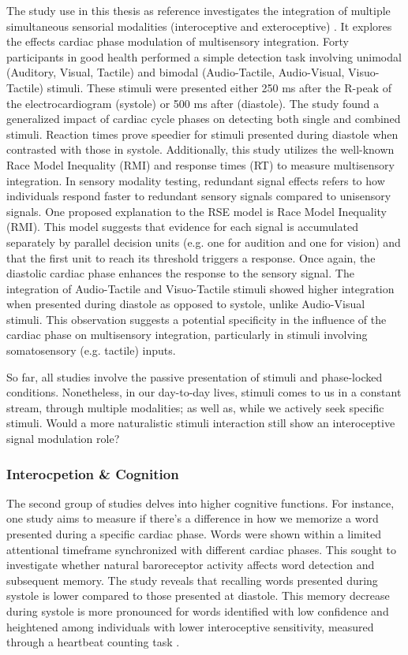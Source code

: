 \documentclass[12pt,oneside,openright]{report}
\begin{document}
The study use in this thesis as reference investigates the integration of multiple simultaneous sensorial modalities (interoceptive and exteroceptive) \parencite{SALTAFOSSI2023108642}. It explores the effects cardiac phase modulation of multisensory integration. Forty participants in good health performed a simple detection task involving unimodal (Auditory, Visual, Tactile) and bimodal (Audio-Tactile, Audio-Visual, Visuo-Tactile) stimuli. These stimuli were presented either 250 ms after the R-peak of the electrocardiogram (systole) or 500 ms after (diastole). The study found a generalized impact of cardiac cycle phases on detecting both single and combined stimuli. Reaction times prove speedier for stimuli presented during diastole when contrasted with those in systole. Additionally, this study utilizes the well-known Race Model Inequality (RMI) and response times (RT) to measure multisensory integration. In sensory modality testing, redundant signal effects refers to how individuals respond faster to redundant sensory signals compared to unisensory signals. One proposed explanation to the RSE model is Race Model Inequality (RMI). This model suggests that evidence for each signal is accumulated separately by parallel decision units (e.g. one for audition and one for vision) and that the first unit to reach its threshold triggers a response\parencite{Innes2019ACA,MILLER1982247}. Once again, the diastolic cardiac phase enhances the response to the sensory signal. The integration of Audio-Tactile and Visuo-Tactile stimuli showed higher integration when presented during diastole as opposed to systole, unlike Audio-Visual stimuli. This observation suggests a potential specificity in the influence of the cardiac phase on multisensory integration, particularly in stimuli involving somatosensory (e.g. tactile) inputs.

So far, all studies involve the passive presentation of stimuli and phase-locked conditions. Nonetheless, in our day-to-day lives, stimuli comes to us in a constant stream, through multiple modalities; as well as, while we actively seek specific stimuli. Would a more naturalistic stimuli interaction still show an interoceptive signal modulation role?

\subsubsection*{Interocpetion \& Cognition}

The second group of studies delves into higher cognitive functions. For instance, one study aims to measure if there's a difference in how we memorize a word presented during a specific cardiac phase. Words were shown within a limited attentional timeframe synchronized with different cardiac phases. This sought to investigate whether natural baroreceptor activity affects word detection and subsequent memory. The study reveals that recalling words presented during systole is lower compared to those presented at diastole. This memory decrease during systole is more pronounced for words identified with low confidence and heightened among individuals with lower interoceptive sensitivity, measured through a heartbeat counting task \parencite{Garfinkel2013-cy}.
\end{document}
